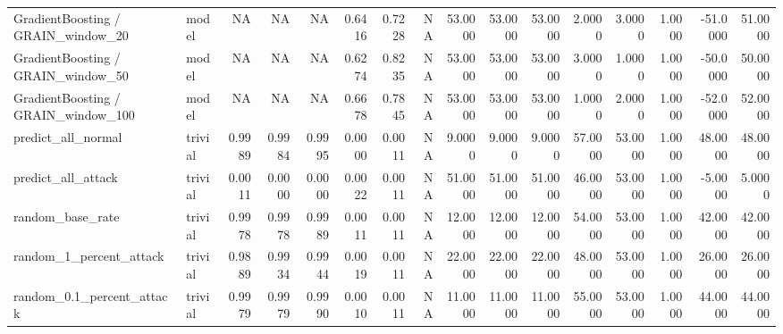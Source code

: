 \begin{tabular}{llrrrrrrrrrrrrrr}
GradientBoosting / GRAIN\_window\_20 & model & NA & NA & NA & 0.6416 & 0.7228 & NA & 53.0000 & 53.0000 & 53.0000 & 2.0000 & 3.0000 & 1.0000 & -51.0000 & 51.0000 \\
GradientBoosting / GRAIN\_window\_50 & model & NA & NA & NA & 0.6274 & 0.8235 & NA & 53.0000 & 53.0000 & 53.0000 & 3.0000 & 1.0000 & 1.0000 & -50.0000 & 50.0000 \\
GradientBoosting / GRAIN\_window\_100 & model & NA & NA & NA & 0.6678 & 0.7845 & NA & 53.0000 & 53.0000 & 53.0000 & 1.0000 & 2.0000 & 1.0000 & -52.0000 & 52.0000 \\
predict\_all\_normal & trivial & 0.9989 & 0.9984 & 0.9995 & 0.0000 & 0.0011 & NA & 9.0000 & 9.0000 & 9.0000 & 57.0000 & 53.0000 & 1.0000 & 48.0000 & 48.0000 \\
predict\_all\_attack & trivial & 0.0011 & 0.0000 & 0.0000 & 0.0022 & 0.0011 & NA & 51.0000 & 51.0000 & 51.0000 & 46.0000 & 53.0000 & 1.0000 & -5.0000 & 5.0000 \\
random\_base\_rate & trivial & 0.9978 & 0.9978 & 0.9989 & 0.0011 & 0.0011 & NA & 12.0000 & 12.0000 & 12.0000 & 54.0000 & 53.0000 & 1.0000 & 42.0000 & 42.0000 \\
random\_1\_percent\_attack & trivial & 0.9889 & 0.9934 & 0.9944 & 0.0019 & 0.0011 & NA & 22.0000 & 22.0000 & 22.0000 & 48.0000 & 53.0000 & 1.0000 & 26.0000 & 26.0000 \\
random\_0.1\_percent\_attack & trivial & 0.9979 & 0.9979 & 0.9990 & 0.0010 & 0.0011 & NA & 11.0000 & 11.0000 & 11.0000 & 55.0000 & 53.0000 & 1.0000 & 44.0000 & 44.0000 \\
\bottomrule
\end{tabular}
